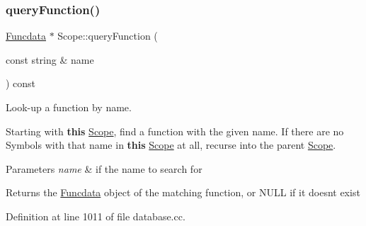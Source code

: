 \subsubsection{\texorpdfstring{queryFunction()}{queryFunction()}\hspace{0.1cm}{\footnotesize\ttfamily [1/2]}}
{\footnotesize\ttfamily \mbox{\hyperlink{class_funcdata}{Funcdata}} $\ast$ Scope\+::query\+Function (\begin{DoxyParamCaption}\item[{const string \&}]{name }\end{DoxyParamCaption}) const}



Look-\/up a function by name. 

Starting with {\bfseries{this}} \mbox{\hyperlink{class_scope}{Scope}}, find a function with the given name. If there are no Symbols with that name in {\bfseries{this}} \mbox{\hyperlink{class_scope}{Scope}} at all, recurse into the parent \mbox{\hyperlink{class_scope}{Scope}}. 
\begin{DoxyParams}{Parameters}
{\em name} & if the name to search for \\
\hline
\end{DoxyParams}
\begin{DoxyReturn}{Returns}
the \mbox{\hyperlink{class_funcdata}{Funcdata}} object of the matching function, or N\+U\+LL if it doesn\textquotesingle{}t exist 
\end{DoxyReturn}


Definition at line 1011 of file database.\+cc.

